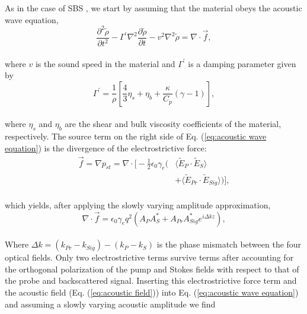 \documentclass[%
  reprint,
  superscriptaddress,
  amsmath,amssymb,
  aps,
  prapplied,
]{revtex4-2}
\begin{document}
As in the case of SBS \cite{boyd2020nonlinear}, we start by assuming that the material obeys the acoustic wave equation,
\\
\begin{equation}
    \frac{\partial^{2}\tilde{\rho}}{\partial t^{2}} - \Gamma^{\prime}\nabla^{2}\frac{\partial\tilde{\rho}}{\partial t} - v^{2}\nabla^{2}\tilde{\rho} = \nabla\cdot\vec{f},
    \label{eq:acoustic wave equation}
\end{equation}
\\
\noindent where $v$ is the sound speed in the material and $\Gamma^{\prime}$ is a damping parameter given by
\\
\begin{equation}
    \Gamma^{\prime} = \frac{1}{\rho}\left[\frac{4}{3}\eta_{s} + \eta_{b} + \frac{\kappa}{C_{p}}(\gamma - 1)\right],
\end{equation}
\\
\noindent where $\eta_{s}$ and $\eta_{b}$ are the shear and bulk viscosity coefficients of the material, respectively. The source term on the right side of Eq. (\ref{eq:acoustic wave equation}) is the divergence of the electrostrictive force:
\\
\begin{equation}
\begin{split}
    \vec{f} = \nabla p_{st} = \nabla \cdot \Bigg[-\frac{1}{2}\epsilon_{0}\gamma_{e}\Big(&\langle\tilde{E}_{P} \cdot \tilde{E}_{S}\rangle \\
    &+ \langle\tilde{E}_{Pr} \cdot \tilde{E}_{Sig}\rangle\Big)\Bigg],
\end{split}
\end{equation}
\\
which yields, after applying the slowly varying amplitude approximation,
\\
\begin{equation}
    \nabla\cdot\vec{f} = \epsilon_{0}\gamma_{e}q^{2}(A_{P}A_{S}^{*} + A_{Pr}A_{Sig}^{*}e^{i\Delta kz}),
\end{equation}
\\
Where $\Delta k = (k_{Pr} - k_{Sig}) - (k_{P} - k_{S})$ is the phase mismatch between the four optical fields. Only two electrostrictive terms survive terms after accounting for the orthogonal polarization of the pump and Stokes fields with respect to that of the probe and backscattered signal. Inserting this electrostrictive force term and the acoustic field (Eq. (\ref{eq:acoustic field})) into Eq. (\ref{eq:acoustic wave equation}) and assuming a slowly varying acoustic amplitude we find
\end{document}
